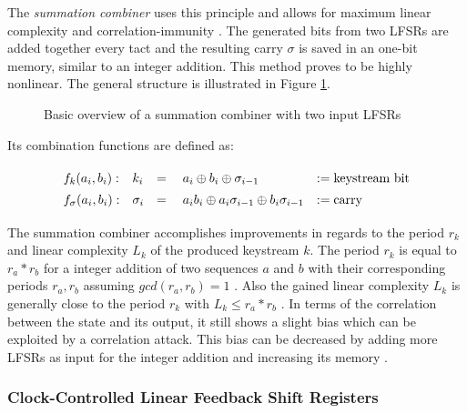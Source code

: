 The \emph{summation combiner} uses this principle and allows for maximum linear complexity and correlation-immunity \cite[p. 261]{Rueppel.1986b}. The generated bits from two LFSRs are added together every tact and the resulting carry $\sigma$ is saved in an one-bit memory, similar to an integer addition. This method proves to be highly nonlinear. The general structure is illustrated in Figure \ref{fig:summation-combiner}. \cite[p. 70]{Meier.1992} \\

\begin{figure}[htbp]
	\centering
	
	\caption{Basic overview of a summation combiner with two input LFSRs}
	\label{fig:summation-combiner}
\end{figure}

\vspace{0,7cm}

Its combination functions are defined as:

\[\def\arraystretch{1.4}\begin{array}{llll}
	f_k(a_i, b_i): & k_i &= \quad a_i \oplus b_i \oplus \sigma_{i-1} &:= \text{keystream bit}\\
	f_\sigma(a_i, b_i): & \sigma_{i} &= \quad a_ib_i \oplus a_i\sigma_{i-1} \oplus b_i\sigma_{i-1} &:= \text{carry}\\
\end{array}\]

\vspace{0,4cm}

The summation combiner accomplishes improvements in regards to the period $r_k$ and linear complexity $L_k$ of the produced keystream $k$. The period $r_k$ is equal to $r_a*r_b$ for a integer addition of two sequences $a$ and $b$ with their corresponding periods $r_a, r_b$ assuming $gcd(r_a,r_b)=1$ \cite[p. 220]{Rueppel.1986}. Also the gained linear complexity $L_k$ is generally close to the period $r_k$ with $L_k \leq r_a*r_b$ \cite[p. 225]{Rueppel.1986}. In terms of the correlation between the state and its output, it still shows a slight bias which can be exploited by a correlation attack. This bias can be decreased by adding more LFSRs as input for the integer addition and increasing its memory \cite[pp. 81-82]{Meier.1992}. \\

\subsubsection{Clock-Controlled Linear Feedback Shift Registers}

